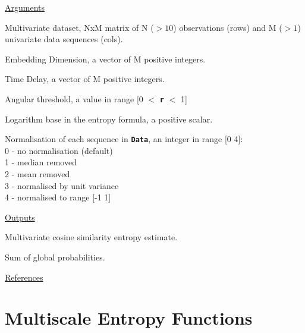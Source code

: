\documentclass[12pt, a4paper, titlepage, openany]{book}
\begin{document}
\noindent \ul{Arguments}
\begin{description}[labelsep=1cm, labelwidth=2cm, nosep, style=multiline,leftmargin=3cm]\footnotesize
\item[\texttt{Data}]	Multivariate dataset, NxM matrix of N ($>10$) observations (rows) and M ($> 1$) univariate data sequences (cols).
\item[\texttt{m}]		Embedding Dimension, a vector of M positive integers.
\item[\texttt{tau}]		Time Delay, a vector of M positive integers.
\item[\texttt{r}]		Angular threshold, a value in range [0 $<$ \texttt{\textbf{r}} $<$ 1]
\item[\texttt{Logx}]	Logarithm base in the entropy formula, a positive scalar.
\item[\texttt{Norm}]	Normalisation of each sequence in \texttt{\textbf{Data}}, an integer in range [0 4]:\\
						0 - no normalisation (default)\\
						1 - median removed\\
						2 - mean removed\\
						3 - normalised by unit variance\\
						4 - normalised to range [-1 1]
\end{description}

\noindent \ul{Outputs}
\begin{description}[labelsep=1cm, labelwidth=2cm, nosep, style=multiline,leftmargin=3cm]\footnotesize
\item[\texttt{MCoSi}]	Multivariate cosine similarity entropy  estimate.
\item[\texttt{Bm}]	Sum of global probabilities.
\end{description}

\noindent \ul{References}\hspace{1cm}
\cite{CoSi1} \cite{MvCoSi1}







\newpage
\section{Multiscale Entropy Functions}
\vspace{3em}
\end{document}

